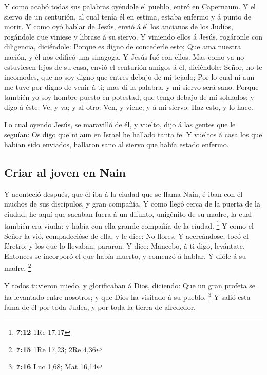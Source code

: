 Y como acabó todas sus palabras oyéndole el pueblo, entró
en Capernaum.  Y el siervo de un centurión, al cual tenía él
en estima, estaba enfermo y á punto de morir.  Y como oyó
hablar de Jesús, envió á él los ancianos de los Judíos, rogándole que
viniese y librase á su siervo.  Y viniendo ellos á Jesús,
rogáronle con diligencia, diciéndole: Porque es digno de concederle
esto;  Que ama nuestra nación, y él nos edificó una
sinagoga.  Y Jesús fué con ellos. Mas como ya no estuviesen
lejos de su casa, envió el centurión amigos á él, diciéndole: Señor, no
te incomodes, que no soy digno que entres debajo de mi tejado;
 Por lo cual ni aun me tuve por digno de venir á ti; mas di
la palabra, y mi siervo será sano.  Porque también yo soy
hombre puesto en potestad, que tengo debajo de mí soldados; y digo á
éste: Ve, y va; y al otro: Ven, y viene; y á mi siervo: Haz esto, y lo
hace.

 Lo cual oyendo Jesús, se maravilló de él, y vuelto, dijo á
las gentes que le seguían: Os digo que ni aun en Israel he hallado tanta
fe.  Y vueltos á casa los que habían sido enviados,
hallaron sano al siervo que había estado enfermo.

\hypertarget{criar-al-joven-en-nain}{%
\subsection{Criar al joven en Nain}\label{criar-al-joven-en-nain}}

 Y aconteció después, que él iba á la ciudad que se llama
Naín, é iban con él muchos de sus discípulos, y gran compañía.
 Y como llegó cerca de la puerta de la ciudad, he aquí que
sacaban fuera á un difunto, unigénito de su madre, la cual también era
viuda: y había con ella grande compañía de la ciudad. \footnote{\textbf{7:12}
  1Re 17,17}  Y como el Señor la vió, compadecióse de ella,
y le dice: No llores.  Y acercándose, tocó el féretro: y
los que lo llevaban, pararon. Y dice: Mancebo, á ti digo, levántate.
 Entonces se incorporó el que había muerto, y comenzó á
hablar. Y dióle á su madre. \footnote{\textbf{7:15} 1Re 17,23; 2Re 4,36}

 Y todos tuvieron miedo, y glorificaban á Dios, diciendo:
Que un gran profeta se ha levantado entre nosotros; y que Dios ha
visitado á su pueblo. \footnote{\textbf{7:16} Luc 1,68; Mat 16,14}
 Y salió esta fama de él por toda Judea, y por toda la
tierra de alrededor.

